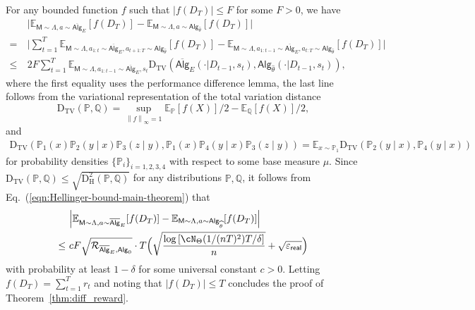 \documentclass[10pt]{article}
\renewcommand{\epsilon}{\varepsilon}
\newcommand{\norm}[1]{\left\|{#1}\right\|} %
\newcommand{\linf}[1]{\norm{#1}_\infty} %
\newcommand{\<}{\left\langle}
\renewcommand{\>}{\right\rangle}
\newcommand{\brac}[1]{{\left[ #1 \right]}}
\newcommand{\E}{\mathbb{E}}
\renewcommand{\P}{\mathbb{P}}
\newcommand{\Q}{\mathbb{Q}}
\newcommand{\inst}{{\mathsf{M}}}
\newcommand{\HelDs}{{\mathrm{D}^2_{\mathrm{H}}}}
\newcommand{\VarD}{{\mathrm{D}_{\mathrm{TV}}}}
\newcommand{\state}{{s}}
\newcommand{\action}{{a}}
\newcommand{\reward}{{r}}
\newcommand{\totlen}{{T}} %
\newcommand{\sAlg}{{\mathsf{Alg}}}
\newcommand{\osAlg}{\overline{\mathsf{Alg}}}
\newcommand{\dset}{{D}}
\newcommand{\Numobs}{{n}}   %
\newcommand{\Parspace}{{\Theta}}
\newcommand{\EstPar}{{\widehat{\theta}}}
\newcommand{\prior}{{\Lambda}}
\newcommand{\shortexp}{{E}}
\newcommand{\geneps}{{\epsilon}_{\sf real}}
\newcommand{\distratio}{{\mathcal{R}}}
\def\sP{{\mathbb{P}}}
\def\sQ{{\mathbb{Q}}}
\begin{document}
For any bounded function $f$ such that $|f(\dset_\totlen)|\leq F$ for some $F>0$,  we have
\begin{align*}
  &~ \Big| \E_{\inst\sim\prior,\action\sim\osAlg_\shortexp}[f(\dset_\totlen)]-
   \E_{\inst\sim\prior,\action\sim\sAlg_\EstPar}[f(\dset_\totlen)]\Big|
   \\
   =&~
\Big| \sum_{t=1}^\totlen\E_{\inst\sim\prior,\action_{1:t}\sim\osAlg_\shortexp,\action_{t+1:\totlen}\sim\sAlg_\EstPar}[f(\dset_\totlen)]-
\E_{\inst\sim\prior,\action_{1:t-1}\sim\osAlg_{\shortexp},\action_{t:\totlen}\sim\sAlg_\EstPar}[f(\dset_\totlen)]\Big|
   \\
\leq&~
2F\sum_{t=1}^\totlen\E_{\inst\sim\prior,\action_{1:t-1}\sim\osAlg_{\shortexp},\state_t}\VarD(\osAlg_{\shortexp}(\cdot|\dset_{t-1},\state_t),\sAlg_{\EstPar}(\cdot|\dset_{t-1},\state_t)),
\end{align*}
where the first equality uses the performance difference lemma, the last line follows from the variational representation of the total variation distance $$\VarD(\sP,\sQ)=\sup_{\linf{f}=1}\E_\sP[f(X)]/2-\E_\sQ[f(X)]/2,$$  and \begin{align}
\VarD(\sP_1(x)\sP_2(y\mid x)\sP_3(z\mid y),\sP_1(x)\sP_{4}(y\mid x)\sP_3(z\mid y))=\E_{x\sim\sP_1}\VarD(\sP_2(y\mid x),\sP_{4}(y\mid x))\label{eq:kl_telescope}
\end{align} 
for probability densities $\{ \P_i\}_{i=1,2,3,4}$ with respect to some base measure $\mu$. Since $\VarD(\P,\Q)\leq\sqrt{\HelDs(\P,\Q)}$ for any distributions $\P,\Q$,  it follows from Eq.~(\ref{eqn:Hellinger-bound-main-theorem}) that
\begin{align*}
 &~ \Big| \E_{\inst\sim\prior,\action\sim\osAlg_{\shortexp}}[f(\dset_\totlen)]-
   \E_{\inst\sim\prior,\action\sim\sAlg_\EstPar}[f(\dset_\totlen)]\Big|\\
  \leq &~cF\sqrt{\distratio_{\osAlg_{\shortexp},\sAlg_0}}\cdot\totlen\Big(\sqrt{\frac{\log \brac{ \cN_{\Parspace}(1/(\Numobs\totlen)^2) \totlen/\delta } }{n}} + \sqrt{\geneps}\Big)
\end{align*}
with probability at least $1-\delta$ for some universal constant $c>0$. Letting $f(\dset_\totlen)=\sum_{t=1}^\totlen\reward_t$  and noting that  $|f(\dset_\totlen)|\leq\totlen$ concludes the proof of Theorem~\ref{thm:diff_reward}.
\end{document}
